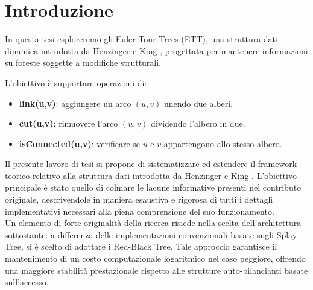 \setchapterpreamble[u]{\margintoc}
\chapter{Introduzione}

In questa tesi esploreremo gli Euler Tour Trees 
(ETT), una struttura dati dinamica introdotta da 
Henzinger e King \cite{HenzingerKing1999}, 
progettata per mantenere informazioni su foreste 
soggette a modifiche strutturali.

L'obiettivo è supportare operazioni di: 
\begin{itemize}
    \item \textbf{link(u,v)}: aggiungere un arco $(u,v)$ unendo due alberi.
    \item \textbf{cut(u,v)}: rimuovere l'arco $(u,v)$ dividendo l'albero in due.
    \item \textbf{isConnected(u,v)}: verificare se $u$ e $v$ appartengono allo stesso albero.
\end{itemize}

Il presente lavoro di tesi si propone di sistematizzare ed estendere il framework teorico relativo 
alla struttura dati introdotta da Henzinger e King \cite{HenzingerKing1999}. L’obiettivo principale è 
stato quello di colmare le lacune informative presenti nel contributo originale, descrivendole in maniera 
esaustiva e rigorosa di tutti i dettagli implementativi necessari alla piena comprensione del suo funzionamento.\\

Un elemento di forte originalità della ricerca risiede nella scelta dell'architettura sottostante: 
a differenza delle implementazioni convenzionali basate sugli Splay Tree, si è scelto di adottare i Red-Black Tree. 
Tale approccio garantisce il mantenimento di un costo computazionale logaritmico nel caso peggiore, 
offrendo una maggiore stabilità prestazionale rispetto alle strutture auto-bilancianti basate sull'accesso.

